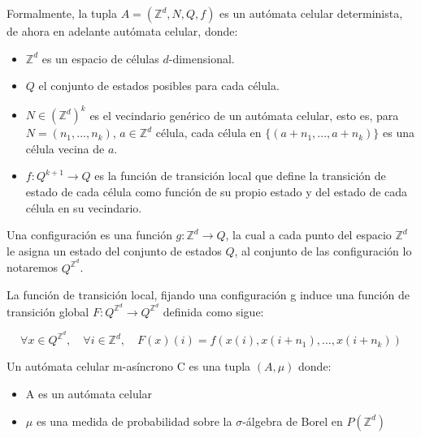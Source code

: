 \documentclass[../proyecto.tex]{memoir}
\begin{document}
\begin{defi}
Formalmente, la tupla $A=(\mathds{Z}^{d}, N, Q, f)$ es un autómata celular determinista, de ahora en adelante autómata celular, donde:

\begin{itemize}
\item $\mathds{Z} ^{d}$ es un espacio de células $d$-dimensional.
\item $Q$ el conjunto de estados posibles para cada célula.
\item $N \in (\mathds{Z}^{d})^{k}$ es el vecindario genérico de un autómata celular, esto es, para $N=(n_{1},...,n_{k})$, $a \in \mathds{Z} ^{d}$ célula, cada célula en $\{(a+n_{1},...,a+n_{k})\}$ es una célula vecina de $a$.
\item $f:Q^{k+1} \rightarrow Q$ es la función de transición local que define la transición de estado de cada célula como función de su propio estado y del estado de cada célula en su vecindario. 
\end{itemize}

\end{defi}

\begin{defi}
Una configuración es una función $g: \mathds{Z}^{d} \rightarrow Q$, la cual a cada punto del espacio $\mathds{Z}^{d}$ le asigna un estado del conjunto de estados $Q$, al conjunto de las configuración lo notaremos $Q^{\mathds{Z}^{d}}$. 
\end{defi}

\begin{defi}
La función de transición local, fijando una configuración g induce una función de transición global $F:Q^{\mathds{Z}^{d}} \rightarrow Q^{\mathds{Z}^{d}}$ definida como sigue:

\begin{equation*}
\forall x \in Q^{\mathds{Z}^{d}}, \quad \forall i \in \mathds{Z}^{d}, \quad F(x)(i) = f(x(i),x(i+n_{1}),...,x(i+n_{k}))
\end{equation*}

\end{defi}

\begin{defi}
Un autómata celular m-asíncrono C es una tupla $(A, \mu)$ donde: 
\begin{itemize}
\item A es un autómata celular 
\item $\mu$ es una medida de probabilidad sobre la $\sigma$-álgebra de Borel en $P(\mathds{Z}^{d})$
\end{itemize} 
\end{defi}
\end{document}
